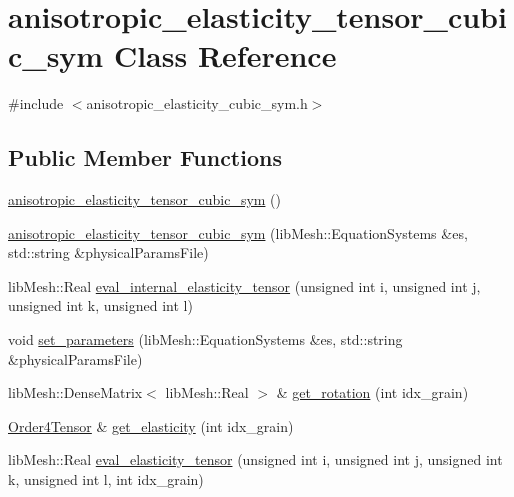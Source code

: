 \hypertarget{classanisotropic__elasticity__tensor__cubic__sym}{}\section{anisotropic\+\_\+elasticity\+\_\+tensor\+\_\+cubic\+\_\+sym Class Reference}
\label{classanisotropic__elasticity__tensor__cubic__sym}


{\ttfamily \#include $<$anisotropic\+\_\+elasticity\+\_\+cubic\+\_\+sym.\+h$>$}

\subsection*{Public Member Functions}
\begin{DoxyCompactItemize}
\item 
\hyperlink{classanisotropic__elasticity__tensor__cubic__sym_a5675387d480fa66bca402e45beb1511b}{anisotropic\+\_\+elasticity\+\_\+tensor\+\_\+cubic\+\_\+sym} ()
\item 
\hyperlink{classanisotropic__elasticity__tensor__cubic__sym_aa9c882754ad85c8bc4ee029768314dee}{anisotropic\+\_\+elasticity\+\_\+tensor\+\_\+cubic\+\_\+sym} (lib\+Mesh\+::\+Equation\+Systems \&es, std\+::string \&physical\+Params\+File)
\item 
lib\+Mesh\+::\+Real \hyperlink{classanisotropic__elasticity__tensor__cubic__sym_a996d32f5c4caaa98626d67388a42199e}{eval\+\_\+internal\+\_\+elasticity\+\_\+tensor} (unsigned int i, unsigned int j, unsigned int k, unsigned int l)
\item 
void \hyperlink{classanisotropic__elasticity__tensor__cubic__sym_ad878b72419cd348ea928793686c584af}{set\+\_\+parameters} (lib\+Mesh\+::\+Equation\+Systems \&es, std\+::string \&physical\+Params\+File)
\item 
lib\+Mesh\+::\+Dense\+Matrix$<$ lib\+Mesh\+::\+Real $>$ \& \hyperlink{classanisotropic__elasticity__tensor__cubic__sym_a7506fd6962d7e0bb1af1110db1f879b3}{get\+\_\+rotation} (int idx\+\_\+grain)
\item 
\hyperlink{class_order4_tensor}{Order4\+Tensor} \& \hyperlink{classanisotropic__elasticity__tensor__cubic__sym_a3480e2bebf2d536c880a3a496d0e8042}{get\+\_\+elasticity} (int idx\+\_\+grain)
\item 
lib\+Mesh\+::\+Real \hyperlink{classanisotropic__elasticity__tensor__cubic__sym_a872fab76533ebcd85f8139b60b2c1bbc}{eval\+\_\+elasticity\+\_\+tensor} (unsigned int i, unsigned int j, unsigned int k, unsigned int l, int idx\+\_\+grain)
\end{DoxyCompactItemize}



